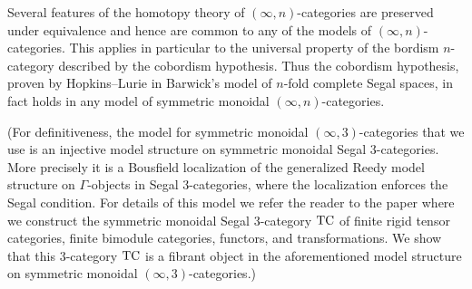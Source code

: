 \documentclass[a4paper]{amsart}
\begin{document}
Several features of the homotopy theory of $(\infty,n)$-categories are preserved under equivalence and hence are common to any of the models of $(\infty,n)$-categories. This applies in particular to the universal property of the bordism $n$-category described by the cobordism hypothesis. Thus the cobordism hypothesis, proven by Hopkins--Lurie \cite{Lurie_cobhyp} in Barwick's model of $n$-fold complete Segal spaces, in fact holds in any model of symmetric monoidal $(\infty,n)$-categories. 

(For definitiveness, the model for symmetric monoidal $(\infty,3)$-categories that we use is an injective model structure on symmetric monoidal Segal $3$-categories. 
More precisely it is a Bousfield localization of the generalized Reedy model structure on $\Gamma$-objects in Segal 3-categories, where the localization enforces the Segal condition.  For details of this model we refer the reader to the paper \cite{3TC} where we construct the  symmetric monoidal Segal 3-category $\mathrm{TC}$ of finite rigid tensor categories, finite bimodule categories, functors, and transformations. We show that this 3-category $\mathrm{TC}$ is a fibrant object in the aforementioned model structure on symmetric monoidal $(\infty,3)$-categories.) 




\end{document}
